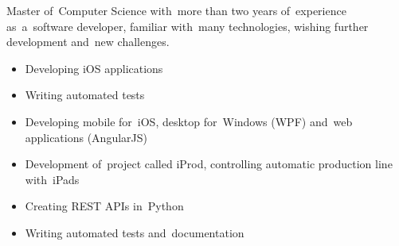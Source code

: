 \documentclass[11pt,a4paper]{article}
\begin{document}
    \bigskip


    \smallskip

    \noindent
    Master of~Computer Science with~more than two years of~experience as~a~software developer, familiar with~many
    technologies, wishing further development and~new challenges.


    \bigskip


    \smallskip

    \vspace{-0.2cm}
    \begin{itemize} \itemsep1pt \parskip0pt 
        \item Developing iOS applications
        \item Writing automated tests
    \end{itemize}
    \vspace{-0.2cm}
    \vspace{-0.2cm}
    \begin{itemize} \itemsep1pt \parskip0pt 
        \item Developing mobile for~iOS, desktop for~Windows (WPF) and~web applications (AngularJS)
        \item Development of~project called iProd, controlling automatic production line with~iPads
        \item Creating REST APIs in~Python
        \item Writing automated tests and~documentation
    \end{itemize}


    \medskip
  
\end{document}
